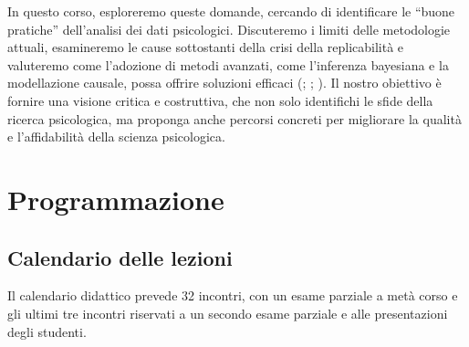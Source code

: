 \documentclass[
  letterpaper,
  DIV=11,
  numbers=noendperiod]{scrreprt}
\theoremstyle{definition}
\theoremstyle{remark}
\begin{document}
In questo corso, esploreremo queste domande, cercando di identificare le
``buone pratiche'' dell'analisi dei dati psicologici. Discuteremo i
limiti delle metodologie attuali, esamineremo le cause sottostanti della
crisi della replicabilità e valuteremo come l'adozione di metodi
avanzati, come l'inferenza bayesiana e la modellazione causale, possa
offrire soluzioni efficaci
(;
;
). Il nostro
obiettivo è fornire una visione critica e costruttiva, che non solo
identifichi le sfide della ricerca psicologica, ma proponga anche
percorsi concreti per migliorare la qualità e l'affidabilità della
scienza psicologica.

\part{Programmazione}

\chapter{Calendario delle lezioni}\label{calendario-delle-lezioni}

Il calendario didattico prevede 32 incontri, con un esame parziale a
metà corso e gli ultimi tre incontri riservati a un secondo esame
parziale e alle presentazioni degli studenti.
\end{document}
